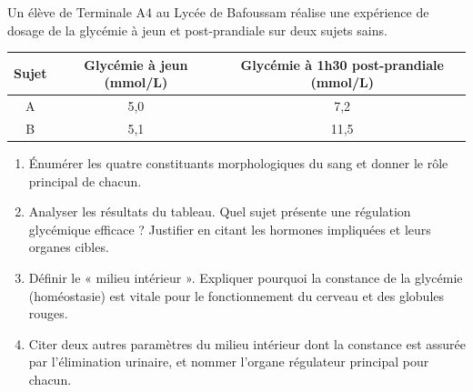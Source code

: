 \documentclass[11pt]{article}
\begin{document}
\begin{exercice}
Un élève de Terminale A4 au Lycée de Bafoussam réalise une expérience de dosage de la glycémie à jeun et post-prandiale sur deux sujets sains.
\begin{center}
\begin{tabular}{|c|c|c|}
\hline
\textbf{Sujet} & \textbf{Glycémie à jeun (mmol/L)} & \textbf{Glycémie à 1h30 post-prandiale (mmol/L)} \\
\hline
A & 5,0 & 7,2 \\
\hline
B & 5,1 & 11,5 \\
\hline
\end{tabular}
\end{center}
\begin{enumerate}
    \item Énumérer les quatre constituants morphologiques du sang et donner le rôle principal de chacun.
    \item Analyser les résultats du tableau. Quel sujet présente une régulation glycémique efficace ? Justifier en citant les hormones impliquées et leurs organes cibles.
    \item Définir le « milieu intérieur ». Expliquer pourquoi la constance de la glycémie (homéostasie) est vitale pour le fonctionnement du cerveau et des globules rouges.
    \item Citer deux autres paramètres du milieu intérieur dont la constance est assurée par l'élimination urinaire, et nommer l'organe régulateur principal pour chacun.
\end{enumerate}
\end{exercice}
\end{document}
